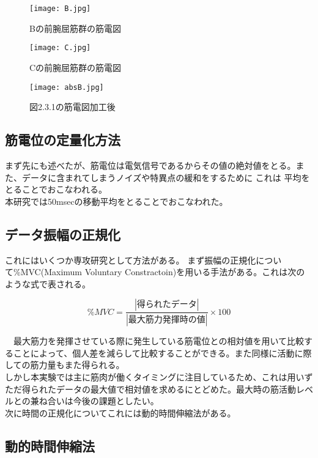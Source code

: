\documentclass[11pt,a4j,notitlepage]{jreport}
\begin{document}
\begin{figure}[htbp]
\begin{minipage}{0.3\hsize}
\begin{center}
\texttt{[image: B.jpg]}
\caption{Bの前腕屈筋群の筋電図}
\end{center}
\end{minipage}
\begin{minipage}{0.3\hsize}
\begin{center}
\texttt{[image: C.jpg]}
\caption{Cの前腕屈筋群の筋電図}
\end{center}
\end{minipage}
\begin{minipage}{0.3\hsize}
\begin{center}
\texttt{[image: absB.jpg]}
\caption{図2.3.1の筋電図加工後}
\end{center}
\end{minipage}
\end{figure}

\subsection{筋電位の定量化方法}
まず先にも述べたが、筋電位は電気信号であるからその値の絶対値をとる。また、データに含まれてしまうノイズや特異点の緩和をするために
これは
平均をとることでおこなわれる。\\
本研究では50msecの移動平均をとることでおこなわれた。\\
\subsection{データ振幅の正規化}
これにはいくつか専攻研究として方法がある。
まず振幅の正規化について\%MVC(Maximum Voluntary Constractoin)を用いる手法がある。これは次のような式で表される。

\[
\%MVC=\frac{|得られたデータ| }{|最大筋力発揮時の値|}\times 100
\]

　最大筋力を発揮させている際に発生している筋電位との相対値を用いて比較することによって、個人差を減らして比較することができる。また同様に活動に際しての筋力量もまた得られる。\\
しかし本実験では主に筋肉が働くタイミングに注目しているため、これは用いずただ得られたデータの最大値で相対値を求めるにとどめた。最大時の筋活動レベルとの兼ね合いは今後の課題としたい。\\
次に時間の正規化についてこれには動的時間伸縮法がある。

\subsection{動的時間伸縮法}
\end{document}
